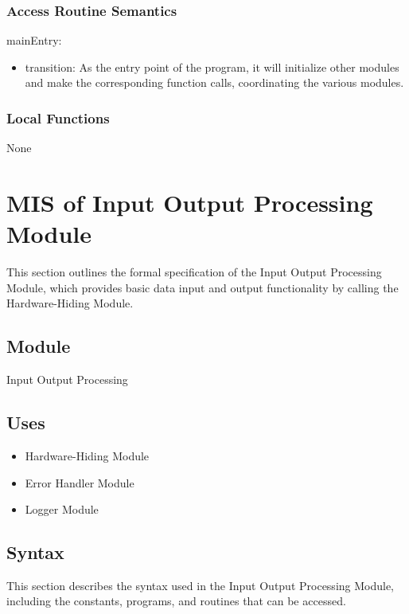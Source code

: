 \documentclass[12pt, titlepage]{article}
\begin{document}
\subsubsection{Access Routine Semantics}

\noindent mainEntry:
\begin{itemize}
\item transition: As the entry point of the program, it will initialize other
modules and make the corresponding function calls, coordinating the various
modules.
\end{itemize}

\subsubsection{Local Functions}

None

\newpage

\section{MIS of Input Output Processing Module} \label{MIS_IO}

This section outlines the formal specification of the Input Output Processing
Module, which provides basic data input and output functionality by calling the
Hardware-Hiding Module.

\subsection{Module}

Input Output Processing

\subsection{Uses}

\begin{itemize}
\item Hardware-Hiding Module
\item Error Handler Module
\item Logger Module
\end{itemize}

\subsection{Syntax}

This section describes the syntax used in the Input Output Processing Module,
including the constants, programs, and routines that can be accessed.
\end{document}
